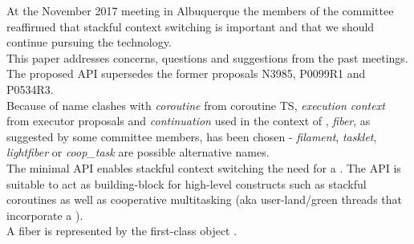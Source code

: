 
At the November 2017 meeting in Albuquerque the members of the committee
reaffirmed that stackful context switching is important and that we should
continue pursuing the technology.\\

This paper addresses concerns, questions and suggestions from the past meetings.
The proposed API supersedes the former proposals N3985\cite{N3985},
P0099R1\cite{P0099R1} and P0534R3\cite{P0534R3}.\\
Because of name clashes with \emph{coroutine} from coroutine TS,
\emph{execution context} from executor proposals and \emph{continuation} used
in the context of , \emph{fiber}, as suggested by some
committee members, has been chosen - \emph{filament}, \emph{tasklet},
\emph{lightfiber} or \emph{coop\_task} are possible alternative names.\\

The minimal API enables stackful context switching  the need for a
. The API is suitable to act as building-block for high-level
constructs such as stackful coroutines as well as cooperative multitasking
(aka user-land/green threads that incorporate a ).\\

A fiber is represented by the first-class object \fiber.

